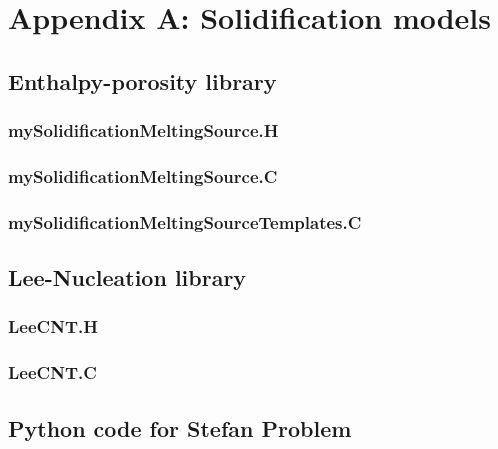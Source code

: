 
\chapter{Appendix A: Solidification models} %

\label{AppendixA} %

\section{Enthalpy-porosity library}
\subsection{mySolidificationMeltingSource.H}

\subsection{mySolidificationMeltingSource.C}

\subsection{mySolidificationMeltingSourceTemplates.C}

\section{Lee-Nucleation library}
\subsection{LeeCNT.H}

\subsection{LeeCNT.C}

\section{Python code for Stefan Problem}




